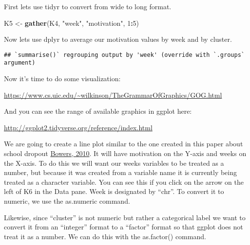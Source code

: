 \documentclass[
]{article}
\newenvironment{Shaded}{\begin{snugshade}}{\end{snugshade}}
\newcommand{\DataTypeTok}[1]{\textcolor[rgb]{0.13,0.29,0.53}{#1}}
\newcommand{\DecValTok}[1]{\textcolor[rgb]{0.00,0.00,0.81}{#1}}
\newcommand{\KeywordTok}[1]{\textcolor[rgb]{0.13,0.29,0.53}{\textbf{#1}}}
\newcommand{\NormalTok}[1]{#1}
\newcommand{\OperatorTok}[1]{\textcolor[rgb]{0.81,0.36,0.00}{\textbf{#1}}}
\newcommand{\StringTok}[1]{\textcolor[rgb]{0.31,0.60,0.02}{#1}}
\begin{document}
First lets use tidyr to convert from wide to long format.

\begin{Shaded}
\begin{Highlighting}[]
\NormalTok{K5 <-}\StringTok{ }\KeywordTok{gather}\NormalTok{(K4, }\StringTok{"week"}\NormalTok{, }\StringTok{"motivation"}\NormalTok{, }\DecValTok{1}\OperatorTok{:}\DecValTok{5}\NormalTok{)}
\end{Highlighting}
\end{Shaded}

Now lets use dplyr to average our motivation values by week and by
cluster.

\begin{Shaded}
\end{Shaded}

\begin{verbatim}
## `summarise()` regrouping output by 'week' (override with `.groups` argument)
\end{verbatim}

Now it's time to do some visualization:

\url{https://www.cs.uic.edu/~wilkinson/TheGrammarOfGraphics/GOG.html}

And you can see the range of available graphics in ggplot here:

\url{http://ggplot2.tidyverse.org/reference/index.html}

We are going to create a line plot similar to the one created in this
paper about school dropout
\href{http://pareonline.net/pdf/v15n7.pdf}{Bowers, 2010}. It will have
motivation on the Y-axis and weeks on the X-axis. To do this we will
want our weeks variables to be treated as a number, but because it was
created from a variable name it is currently being treated as a
character variable. You can see this if you click on the arrow on the
left of K6 in the Data pane. Week is designated by ``chr''. To convert
it to numeric, we use the as.numeric command.

Likewise, since ``cluster'' is not numeric but rather a categorical
label we want to convert it from an ``integer'' format to a ``factor''
format so that ggplot does not treat it as a number. We can do this with
the as.factor() command.
\end{document}

